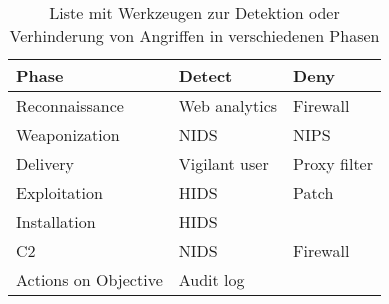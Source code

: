 \begin{table}[]
    \begin{center}
        \begin{tabular}{|l|l|l|}
            \hline
            Phase                & Detect        & Deny         \\ \hline
            Reconnaissance       & Web analytics & Firewall     \\ \hline
            Weaponization        & NIDS          & NIPS         \\ \hline
            Delivery             & Vigilant user & Proxy filter \\ \hline
            Exploitation         & HIDS          & Patch        \\ \hline
            Installation         & HIDS          &              \\ \hline
            C2                   & NIDS          & Firewall     \\ \hline
    Actions on Objective & Audit log     &              \\ \hline
        \end{tabular}
    \caption{Liste mit Werkzeugen zur Detektion oder Verhinderung von Angriffen in verschiedenen Phasen}
    \label{table:defense_tools}
    \end{center}
\end{table}

